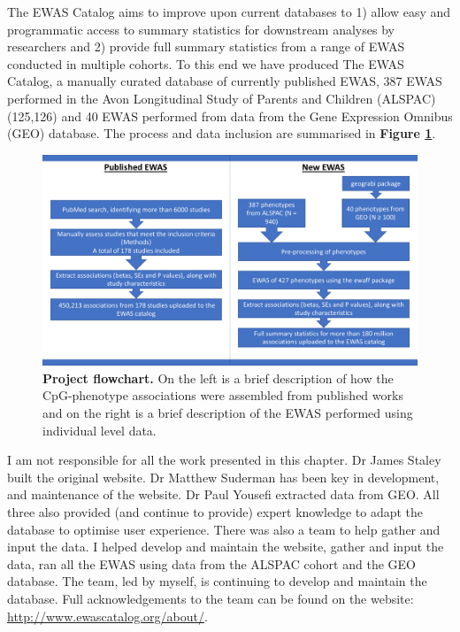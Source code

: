 \documentclass[11pt,oneside]{bristolthesis}
\begin{document}
The EWAS Catalog aims to improve upon current databases to 1) allow easy and programmatic access to summary statistics for downstream analyses by researchers and 2) provide full summary statistics from a range of EWAS conducted in multiple cohorts. To this end we have produced The EWAS Catalog, a manually curated database of currently published EWAS, 387 EWAS performed in the Avon Longitudinal Study of Parents and Children (ALSPAC) (125,126) and 40 EWAS performed from data from the Gene Expression Omnibus (GEO) database. The process and data inclusion are summarised in \textbf{Figure \ref{fig:catalog-project-workflow}}.


\begin{figure}

{\centering \includegraphics[width=1\linewidth]{figure/03-ewas_catalog/project_flowchart} 

}

\caption{\textbf{Project flowchart.} On the left is a brief description of how the CpG-phenotype associations were assembled from published works and on the right is a brief description of the EWAS performed using individual level data.}\label{fig:catalog-project-workflow}
\end{figure}
I am not responsible for all the work presented in this chapter. Dr James Staley built the original website. Dr Matthew Suderman has been key in development, and maintenance of the website. Dr Paul Yousefi extracted data from GEO. All three also provided (and continue to provide) expert knowledge to adapt the database to optimise user experience. There was also a team to help gather and input the data. I helped develop and maintain the website, gather and input the data, ran all the EWAS using data from the ALSPAC cohort and the GEO database. The team, led by myself, is continuing to develop and maintain the database. Full acknowledgements to the team can be found on the website: \url{http://www.ewascatalog.org/about/}.
\end{document}
